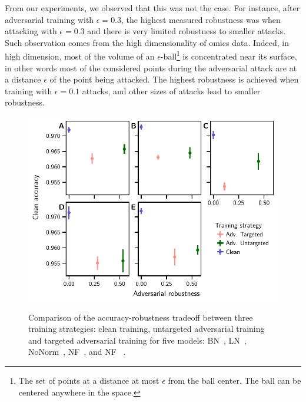 \documentclass[../main.tex]{subfiles}
\begin{document}
		From our experiments, we observed that this was not the case.
		For instance, after adversarial training with \(\epsilon = 0.3\), the highest measured robustness was when attacking with \(\epsilon=0.3\) and there is very limited robustness to smaller attacks.
		Such observation comes from the high dimensionality of omics data.
		Indeed, in high dimension, most of the volume of an \(\epsilon\)-ball\footnote{The set of points at a distance at most \(\epsilon\) from the ball center. The ball can be centered anywhere in the space.} is concentrated near its surface, in other words most of the considered points during the adversarial attack are at a distance \(\epsilon\) of the point being attacked.
		The highest robustness is achieved when training with \(\epsilon=0.1\) attacks, and other sizes of attacks lead to smaller robustness.

		\begin{figure}[htbp]
			\centering
			\begin{subcaptiongroup}
				\includegraphics{adversarial_robustness_strategy.pdf}
				\label{fig:adv_robust_strat_mlp_bn}
				\label{fig:adv_robust_strat_mlp_ln}
				\label{fig:adv_robust_strat_mlp_nonorm}
				\label{fig:adv_robust_strat_mlp_fn}
				\label{fig:adv_robust_strat_mlp_fn_agc}
			\end{subcaptiongroup}
			\caption[Comparison of the accuracy-robustness tradeoff with various training strategies]{Comparison of the accuracy-robustness tradeoff between three training strategies: clean training, untargeted adversarial training and targeted adversarial training for five models:  BN~,  LN~,  NoNorm~,  NF~, and  NF ~.}\label{fig:adv_robust_strat}
		\end{figure}
\end{document}
